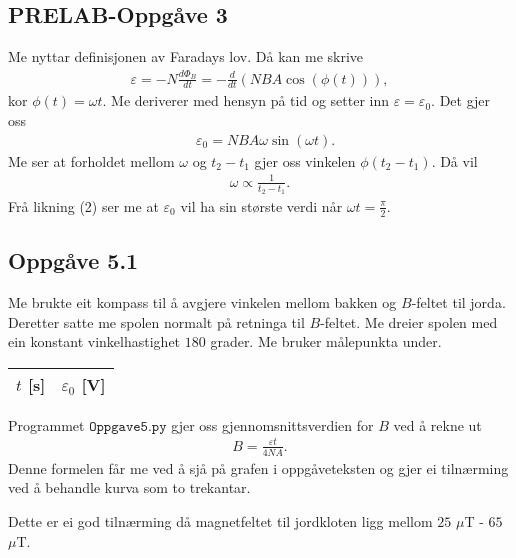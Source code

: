 \documentclass[11pt, a4paper]{article}
\begin{document}
  \subsection*{PRELAB-Oppgåve 3}
    Me nyttar definisjonen av Faradays lov. Då kan me skrive
    \begin{align*}
      \varepsilon = -N\frac{d\Phi_{B}}{dt} = -\frac{d}{dt}\left( NBA\cos(\phi(t)) \right),
    \end{align*}
    kor $\phi(t) = \omega t$. Me deriverer med hensyn på tid og setter inn $\varepsilon = \varepsilon_0$. Det gjer oss
    \begin{align}
      &\varepsilon_0 = NBA\omega\sin(\omega t).
    \end{align}
    Me ser at forholdet mellom $\omega$ og $t_2 - t_1$ gjer oss vinkelen $\phi(t_2 - t_1)$. Då vil
    \begin{align*}
      \omega \propto \frac{1}{t_2 - t_1}.
    \end{align*}
    Frå likning (2) ser me at $\varepsilon_0$ vil ha sin største verdi når $\omega t = \frac{\pi}{2}$.



  \subsection*{Oppgåve 5.1}
    Me brukte eit kompass til å avgjere vinkelen mellom bakken og $B$-feltet til jorda. Deretter satte me spolen normalt på retninga til $B$-feltet. Me dreier spolen med ein 
    konstant vinkelhastighet $180$ grader.
    Me bruker målepunkta under.
    \begin{center}
      \begin{tabular}{|l|l|}
        \hline
        $t$ [s] & $\varepsilon_0$ [V] \\
        \hline
        
        \hline
      \end{tabular}
    \end{center}
    Programmet $\texttt{Oppgave5.py}$ gjer oss gjennomsnittsverdien for $B$ ved å rekne  ut 
    \begin{align*}
      B = \frac{\varepsilon t}{4NA}.
    \end{align*}
    Denne formelen får me ved å sjå på grafen i oppgåveteksten og gjer ei tilnærming ved å behandle kurva som to trekantar.
    \begin{center}
      
    \end{center}
    Dette er ei god tilnærming då magnetfeltet til jordkloten ligg mellom $25$ $\mu$T - $65$ $\mu$T.
\end{document}
